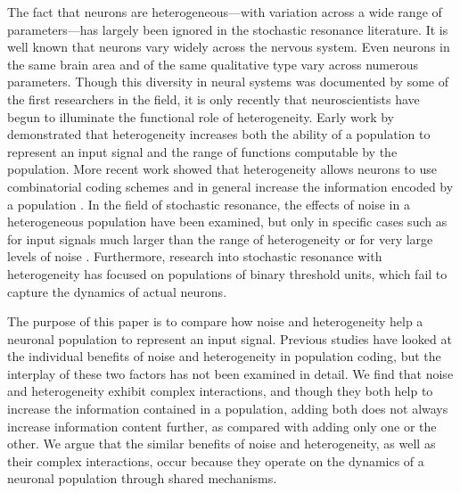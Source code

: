 \documentclass[12pt]{article}
\begin{document}
The fact that neurons are heterogeneous---with variation across a wide range of parameters---has largely been ignored in the stochastic resonance literature. It is well known that neurons vary widely across the nervous system. Even neurons in the same brain area and of the same qualitative type vary across numerous parameters. Though this diversity in neural systems was documented by some of the first researchers in the field, it is only recently that neuroscientists have begun to illuminate the functional role of heterogeneity. Early work by \cite{Eliasmith2003} demonstrated that heterogeneity increases both the ability of a population to represent an input signal and the range of functions computable by the population. More recent work showed that heterogeneity allows neurons to use combinatorial coding schemes \citep{Osborne2008} and in general increase the information encoded by a population \citep{Shamir2006,Chelaru2008,Padmanabhan2010,Ecker2011}. In the field of stochastic resonance, the effects of noise in a heterogeneous population have been examined, but only in specific cases such as for input signals much larger than the range of heterogeneity \citep{Stocks2000} or for very large levels of noise \citep{McDonnell2006}. Furthermore, research into stochastic resonance with heterogeneity has focused on populations of binary threshold units, which fail to capture the dynamics of actual neurons.

The purpose of this paper is to compare how noise and heterogeneity help a neuronal population to represent an input signal. Previous studies have looked at the individual benefits of noise and heterogeneity in population coding, but the interplay of these two factors has not been examined in detail. We find that noise and heterogeneity exhibit complex interactions, and though they both help to increase the information contained in a population, adding both does not always increase information content further, as compared with adding only one or the other. We argue that the similar benefits of noise and heterogeneity, as well as their complex interactions, occur because they operate on the dynamics of a neuronal population through shared mechanisms.
\end{document}
